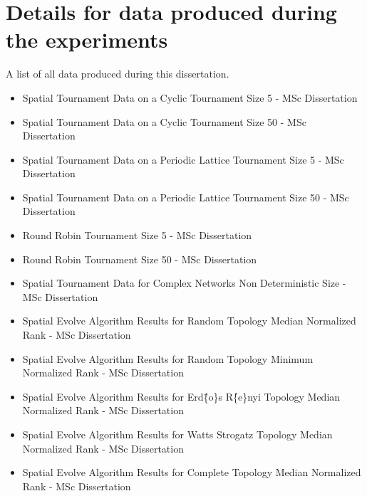 \section{Details for data produced during the experiments}
\label{append:data}
A list of all data produced during this dissertation.
\begin{itemize}
  \item Spatial Tournament Data on a Cyclic Tournament Size 5 - MSc Dissertation~\cite{glynatsi_nikoleta_2016_61264}
  \item Spatial Tournament Data on a Cyclic Tournament Size 50 - MSc Dissertation~\cite{glynatsi_nikoleta_2016_61664}
  \item Spatial Tournament Data on a Periodic Lattice Tournament Size 5 - MSc Dissertation~\cite{glynatsi_nikoleta_2016_61665}
  \item Spatial Tournament Data on a Periodic Lattice Tournament Size 50 - MSc Dissertation~\cite{glynatsi_nikoleta_2016_61666}
  \item Round Robin Tournament Size 5 - MSc Dissertation~\cite{glynatsi_nikoleta_2016_61667}
  \item Round Robin Tournament Size 50 - MSc Dissertation~\cite{glynatsi_nikoleta_2016_61668}
  \item Spatial Tournament Data for Complex Networks Non Deterministic Size - MSc Dissertation~\cite{glynatsi_nikoleta_2016_61669}
  \item Spatial Evolve Algorithm Results for Random Topology Median Normalized Rank - MSc Dissertation~\cite{glynatsi_nikoleta_2016_61672}
  \item Spatial Evolve Algorithm Results for Random Topology Minimum Normalized Rank - MSc Dissertation~\cite{glynatsi_nikoleta_2016_61673}
  \item Spatial Evolve Algorithm Results for Erd\"\{o\}s R\'\{e\}nyi Topology Median Normalized Rank - MSc Dissertation~\cite{glynatsi_nikoleta_2016_61677}
  \item Spatial Evolve Algorithm Results for Watts Strogatz Topology Median Normalized Rank - MSc Dissertation~\cite{glynatsi_nikoleta_2016_61678}
  \item Spatial Evolve Algorithm Results for Complete Topology Median Normalized Rank - MSc Dissertation~\cite{glynatsi_nikoleta_2016_61679}
\end{itemize}
